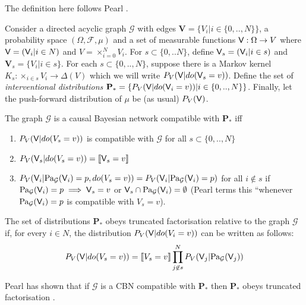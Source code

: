 \begin{definition}\label{def:CBN}
The definition here follows Pearl \cite{pearl_causality:_2009}.

Consider a directed acyclic graph $\mathcal{G}$ with edges $\mathbf{V}=\{V_i|i\in \{0,..,N\}\}$, a probability space $(\Omega,\mathcal{F},\mu)$ and a set of measurable functions $\mathsf{V}:\Omega\to V$ where $\mathsf{V}=(\mathsf{V}_i|i\in N)$ and $V=\times_{i=0}^N V_i$. For $s\subset \{0,..N\}$, define $\mathsf{V}_s=(\mathsf{V}_i|i\in s)$ and $\mathbf{V}_s=\{V_i|i\in s\}$. For each $s\subset \{0,..,N\}$, suppose there is a Markov kernel $K_s:\times_{i\in s}V_i\to \Delta (V)$  which we will write $P_V(\mathsf{V}|do(\mathsf{V}_s=v))$. Define the set of \emph{interventional distributions} $\mathbf{P}_*=\{P_V(\mathsf{V}|do(\mathsf{V}_i=v))|i\in \{0,..,N\}\}$. Finally, let the push-forward distribution of $\mu$ be (as usual) $P_V(\mathsf{V})$.

The graph $\mathcal{G}$ is a causal Bayesian network compatible with $\mathbf{P}_*$ iff
\begin{enumerate}
    \item $P_V(\mathsf{V}|do(V_s=v))$ is compatible with $\mathcal{G}$ for all $s\subset \{0,..,N\}$
    \item $P_V(\mathsf{V}_s|do(V_s=v))=\llbracket \mathsf{V}_s=v \rrbracket$
    \item $P_V(\mathsf{V}_i|\text{Pa}_{\mathcal{G}}(\mathsf{V}_i)=p,do(V_s=v))=P_V(\mathsf{V}_i|\text{Pa}_{\mathcal{G}}(\mathsf{V}_i)=p)$ for all $i\not\in  s$ if $\text{Pa}_{\mathcal{G}}(\mathsf{V}_i)=p\implies \mathsf{V}_s=v$ or $\mathsf{V}_s\cap \text{Pa}_{\mathcal{G}}(\mathsf{V}_i)=\emptyset$ (Pearl terms this ``whenever $\text{Pa}_{\mathcal{G}}(\mathsf{V}_i)=p$ is compatible with $V_s=v$).
\end{enumerate}
\end{definition}

\begin{definition}
The set of distributions $\mathbf{P}_*$ obeys truncated factorisation relative to the graph $\mathcal{G}$ if, for every $i\in N$, the distribution $P_V(\mathsf{V}|do(V_i=v))$ can be written as follows:
\begin{align}
    P_V(\mathsf{V}|do(V_s=v)) = \llbracket V_s=v\rrbracket \prod_{j\not\in s}^N P_V(\mathsf{V}_j|\text{Pa}_{\mathcal{G}}(\mathsf{V}_j)) \label{eq:trunc_fact}
\end{align}
\end{definition}

Pearl has shown that if $\mathcal{G}$ is a CBN compatible with $\mathbf{P}_*$ then $\mathbf{P}_*$ obeys truncated factorisation \cite{pearl_causality:_2009}.

